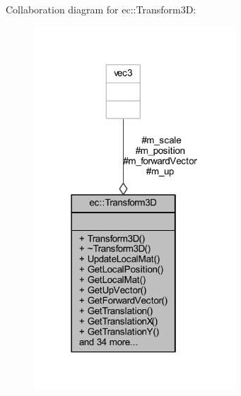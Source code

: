 Collaboration diagram for ec\+:\+:Transform3D\+:\nopagebreak
\begin{figure}[H]
\begin{center}
\leavevmode
\includegraphics[width=214pt]{classec_1_1_transform3_d__coll__graph}
\end{center}
\end{figure}
